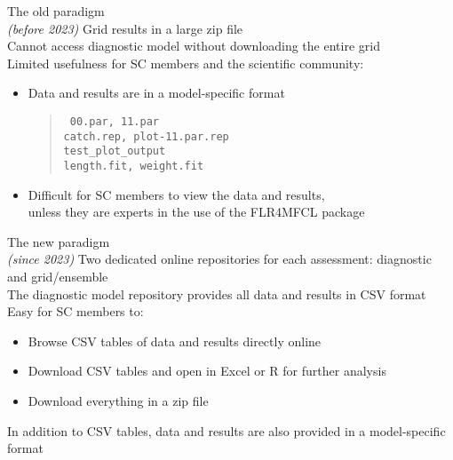\documentclass[aspectratio=169,fleqn]{beamer}
\begin{document}
\begin{frame}{The old paradigm\\[1ex]\small\darkgreen\it (before 2023)}\small
  Grid results in a large zip file\\[2.5ex]
  Cannot access diagnostic model without downloading the entire grid\\[2.5ex]
  {\green Limited usefulness} for SC members and the scientific
  community:\\[1ex]
  \begin{itemize}
    \item Data and results are in a model-specific format\\[1.5ex]
    \begin{quotation}\tt\fns
      00.par, 11.par\\[0.4ex]
      catch.rep, plot-11.par.rep\\[0.4ex]
      test\_plot\_output\\[0.4ex]
      length.fit, weight.fit\\[1ex]
    \end{quotation}
    \item Difficult for SC members to view the data and results,\\[0.3ex]
    unless they are experts in the use of the FLR4MFCL package\\[3ex]
  \end{itemize}
\end{frame}


\begin{frame}{The new paradigm\\[1ex]\small\darkgreen\it (since 2023)}\small
  Two dedicated online repositories for each assessment: diagnostic and
  grid/ensemble\\[3ex]
  The diagnostic model repository provides all data and results in CSV
  format\\[3ex]
  Easy for SC members to:\\
  \begin{itemize}
    \item Browse CSV tables of data and results directly online\\[1ex]
    \item Download CSV tables and open in Excel or R for further analysis\\[1ex]
    \item Download everything in a zip file\\[4ex]
  \end{itemize}
  In addition to CSV tables, data and results are also provided in a
  model-specific format\\[5ex]
\end{frame}
\end{document}
